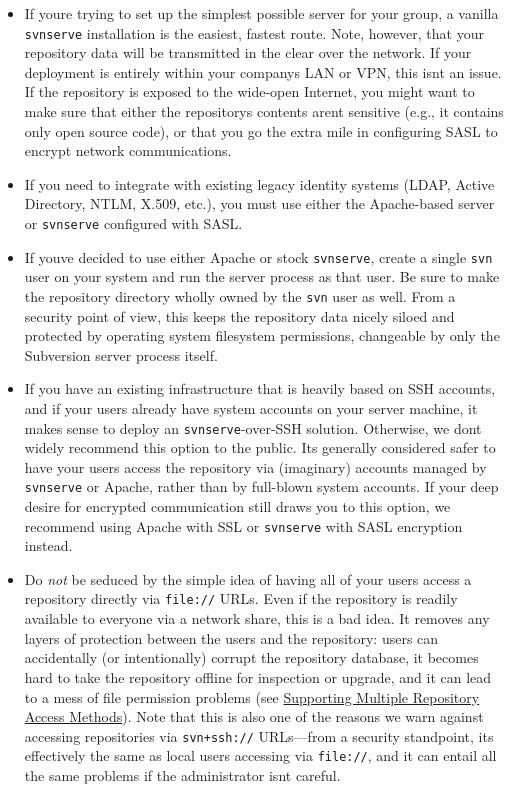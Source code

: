 \begin{itemize}
\item
  If you\textquotesingle re trying to set up the simplest possible
  server for your group, a vanilla \texttt{svnserve} installation is the
  easiest, fastest route. Note, however, that your repository data will
  be transmitted in the clear over the network. If your deployment is
  entirely within your company\textquotesingle s LAN or VPN, this
  isn\textquotesingle t an issue. If the repository is exposed to the
  wide-open Internet, you might want to make sure that either the
  repository\textquotesingle s contents aren\textquotesingle t sensitive
  (e.g., it contains only open source code), or that you go the extra
  mile in configuring SASL to encrypt network communications.
\item
  If you need to integrate with existing legacy identity systems (LDAP,
  Active Directory, NTLM, X.509, etc.), you must use either the
  Apache-based server or \texttt{svnserve} configured with SASL.
\item
  If you\textquotesingle ve decided to use either Apache or stock
  \texttt{svnserve}, create a single \texttt{svn} user on your system
  and run the server process as that user. Be sure to make the
  repository directory wholly owned by the \texttt{svn} user as well.
  From a security point of view, this keeps the repository data nicely
  siloed and protected by operating system filesystem permissions,
  changeable by only the Subversion server process itself.
\item
  If you have an existing infrastructure that is heavily based on SSH
  accounts, and if your users already have system accounts on your
  server machine, it makes sense to deploy an \texttt{svnserve}-over-SSH
  solution. Otherwise, we don\textquotesingle t widely recommend this
  option to the public. It\textquotesingle s generally considered safer
  to have your users access the repository via (imaginary) accounts
  managed by \texttt{svnserve} or Apache, rather than by full-blown
  system accounts. If your deep desire for encrypted communication still
  draws you to this option, we recommend using Apache with SSL or
  \texttt{svnserve} with SASL encryption instead.
\item
  Do \emph{not} be seduced by the simple idea of having all of your
  users access a repository directly via \texttt{file://} URLs. Even if
  the repository is readily available to everyone via a network share,
  this is a bad idea. It removes any layers of protection between the
  users and the repository: users can accidentally (or intentionally)
  corrupt the repository database, it becomes hard to take the
  repository offline for inspection or upgrade, and it can lead to a
  mess of file permission problems (see
  \hyperref[svn.serverconfig.multimethod]{Supporting Multiple Repository
  Access Methods}). Note that this is also one of the reasons we warn
  against accessing repositories via \texttt{svn+ssh://} URLs---from a
  security standpoint, it\textquotesingle s effectively the same as
  local users accessing via \texttt{file://}, and it can entail all the
  same problems if the administrator isn\textquotesingle t careful.
\end{itemize}

